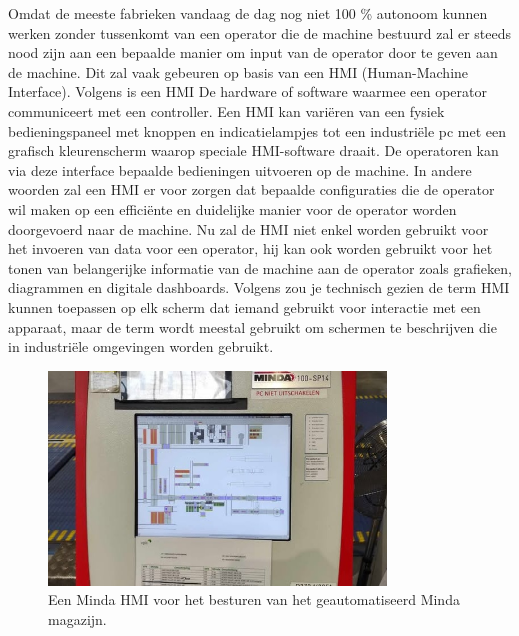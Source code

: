 Omdat de meeste fabrieken vandaag de dag nog niet 100 \% autonoom kunnen werken zonder tussenkomt van een operator die de machine bestuurd zal er steeds nood zijn aan een bepaalde manier om input van de operator door te geven aan de machine. Dit zal vaak gebeuren op basis van een HMI (Human-Machine Interface). 
Volgens \textcite{Nist2025} is een HMI De hardware of software waarmee een operator communiceert met een controller. Een HMI kan variëren van een fysiek bedieningspaneel met knoppen en indicatielampjes tot een industriële pc met een grafisch kleurenscherm waarop speciale HMI-software draait. De operatoren kan via deze interface bepaalde bedieningen uitvoeren op de machine. In andere woorden zal een HMI er voor zorgen dat bepaalde configuraties die de operator wil maken op een efficiënte en duidelijke manier voor de operator worden doorgevoerd naar de machine. 
Nu zal de HMI niet enkel worden gebruikt voor het invoeren van data voor een operator, hij kan ook worden gebruikt voor het tonen van belangerijke informatie van de machine aan de operator zoals grafieken, diagrammen en digitale dashboards. \autocite{Inductive2025}
Volgens \textcite{Copadata2025} zou je technisch gezien de term HMI kunnen toepassen op elk scherm dat iemand gebruikt voor interactie met een apparaat, maar de term wordt meestal gebruikt om schermen te beschrijven die in industriële omgevingen worden gebruikt.

\begin{figure}[H]
    \centering
    \includegraphics[width=0.8\textwidth]{fotos/Minda_HMI.jpg}
    \caption[Minda HMI]{\label{fig:grail}Een Minda HMI voor het besturen van het geautomatiseerd Minda magazijn.}
\end{figure} 

